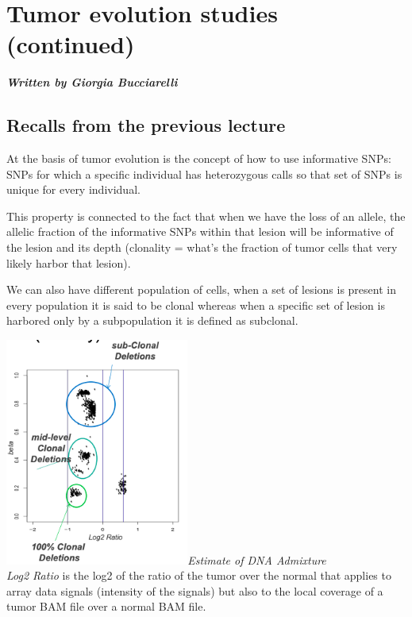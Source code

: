 \graphicspath{{chapters/TumorEvStudiesIIImages/}}
\chapter{Tumor evolution studies (continued)}

\textbf{\textit{Written by Giorgia Bucciarelli}}


\section{Recalls from the previous lecture}

At the basis of tumor evolution is the concept of how to use {informative SNPs}:
SNPs for which a specific individual has heterozygous calls so that set of SNPs
is unique for every individual.

This property is connected to the fact that when we have the loss of an allele,
the allelic fraction of the informative SNPs within that lesion will be
informative of the lesion and its depth (clonality = what's the fraction of
tumor cells that very likely harbor that lesion).

We can also have different population of cells, when a set of lesions is present
in every population it is said to be clonal whereas when a specific set of
lesion is harbored only by a subpopulation it is defined as subclonal.

\includegraphics[width=2.37708in,height=2.94375in]{image1.png}\emph{Estimate of
DNA Admixture}\\

\emph{{Log2 Ratio}} is the log2 of the ratio of the tumor over the normal that
applies to array data signals (intensity of the signals) but also to the local
coverage of a tumor BAM file over a normal BAM file.


